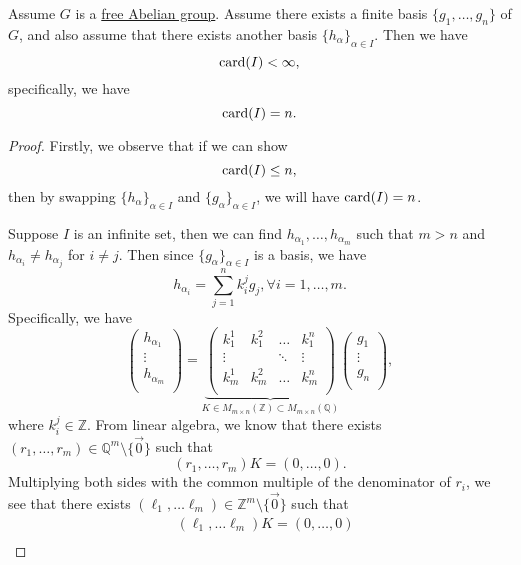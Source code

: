 \begin{theorem}
	Assume \(G\) is a \hyperref[def:free-Abelian-group]{free Abelian group}. Assume there exists a finite basis \(\{g_1, \dots , g_{n}  \}\) of \(G\), and also assume that there exists another basis
	\(\{h_\alpha \}_{\alpha \in I}\). Then we have
	\[
		\operatorname{card}(I)< \infty,
	\]
	specifically, we have
	\[
		\operatorname{card} (I)= n.
	\]
\end{theorem}
\begin{proof}
	Firstly, we observe that if we can show
	\[
		\operatorname{card} (I) \leq n,
	\]
	then by swapping \(\{h_\alpha \}_{\alpha \in I}\) and \(\{g_\alpha \}_{\alpha \in I}\), we will have \(\operatorname{card}(I) = n \).

	Suppose \(I\) is an infinite set, then we can find \(h_{\alpha _1}, \dots , h_{\alpha _m} \) such that \(m>n\) and \(h_{\alpha _i} \neq h_{\alpha _j}\) for \(i \neq j\).
	Then since \(\{g_\alpha \}_{\alpha \in I}\) is a basis, we have
	\[
		h_{\alpha _{i} } = \sum\limits_{j=1}^{n} k_{i} ^j g_{j} , \forall i = 1, \dots , m.
	\]
	Specifically, we have
	\[
		\begin{pmatrix}
			h_{\alpha _1} \\
			\vdots        \\
			h_{\alpha _m} \\
		\end{pmatrix} = \underbrace{\begin{pmatrix}
				k_1^1  & k_1^2 & \dots  & k_1^{n} \\
				\vdots &       & \ddots & \vdots  \\
				k_m^1  & k_m^2 & \dots  & k_m^{n} \\
			\end{pmatrix}}_{K\in M_{m\times n}(\mathbb{Z})\subset M_{m\times n}(\mathbb{Q} )}\begin{pmatrix}
			g_1    \\
			\vdots \\
			g_{n}  \\
		\end{pmatrix},
	\]
	where \(k_{i} ^j\in \mathbb{Z} \). From linear algebra, we know that there exists \((r_1, \dots, r _{m})\in \mathbb{Q} ^m\setminus \{\vec{0} \}\) such that
	\[
		(r_1, \dots , r_{m}) K = (0, \dots , 0 ).
	\]
	Multiplying both sides with the common multiple of the denominator of \(r_{i}\), we see that there exists \((\ell _1, \dots \ell _{m})\in \mathbb{Z} ^m\setminus \{\vec{0} \}\) such that
	\[
		\begin{split}
			         & (\ell _1, \dots \ell _{m})K = (0, \dots , 0 )                                                                                                 \\

\end{split}\]
\end{proof}
